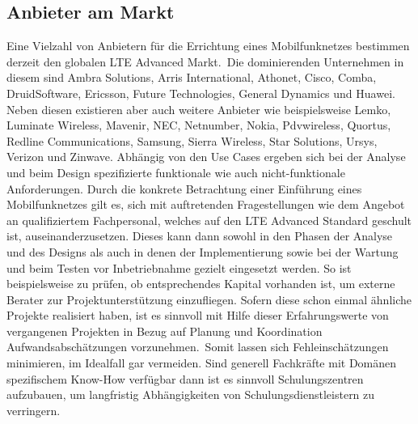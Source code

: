 	\subsection{Anbieter am Markt}
\label{subsec:Anbieter am Markt}
Eine Vielzahl von Anbietern für die Errichtung eines Mobilfunknetzes bestimmen derzeit den globalen LTE Advanced Markt.\ Die dominierenden Unternehmen in diesem sind Ambra Solutions, Arris International,
Athonet, Cisco, Comba, DruidSoftware, Ericsson, Future Technologies, General Dynamics und 
Huawei. Neben diesen existieren aber auch weitere Anbieter wie beispielsweise Lemko, Luminate Wireless,
Mavenir,
NEC,
Netnumber,
Nokia,
Pdvwireless,
Quortus,
Redline Communications,
Samsung,
Sierra Wireless,
Star Solutions,
Ursys,
Verizon und 
Zinwave.\cite{Max19}
Abhängig von den Use Cases ergeben sich bei der Analyse und beim Design spezifizierte funktionale wie auch nicht-funktionale Anforderungen. Durch die konkrete Betrachtung einer Einführung eines Mobilfunknetzes gilt es, sich mit auftretenden Fragestellungen wie dem Angebot an qualifiziertem Fachpersonal, welches auf den LTE Advanced Standard geschult ist, auseinanderzusetzen. Dieses kann dann sowohl in den Phasen der Analyse und des Designs als auch in denen der Implementierung sowie bei der Wartung und beim Testen vor Inbetriebnahme gezielt eingesetzt werden. So ist beispielsweise zu prüfen, ob entsprechendes Kapital vorhanden ist, um externe Berater zur Projektunterstützung einzufliegen. Sofern diese schon einmal ähnliche Projekte realisiert haben, ist es sinnvoll mit Hilfe dieser Erfahrungswerte von vergangenen Projekten in Bezug auf Planung und Koordination Aufwandsabschätzungen vorzunehmen.\ Somit lassen sich Fehleinschätzungen minimieren, im Idealfall gar vermeiden. Sind generell Fachkräfte mit Domänen spezifischem Know-How verfügbar dann ist es sinnvoll Schulungszentren aufzubauen, um langfristig Abhängigkeiten von Schulungsdienstleistern zu verringern.




